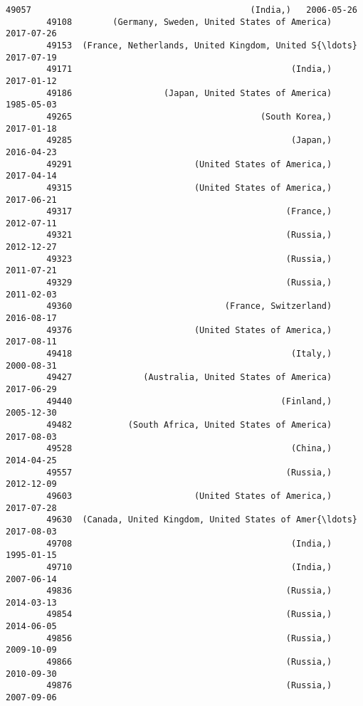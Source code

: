 \documentclass[11pt]{article}
\begin{document}
\begin{Verbatim}[commandchars=\\\{\}]
        49057                                           (India,)   2006-05-26   
        49108        (Germany, Sweden, United States of America)   2017-07-26   
        49153  (France, Netherlands, United Kingdom, United S{\ldots}   2017-07-19   
        49171                                           (India,)   2017-01-12   
        49186                  (Japan, United States of America)   1985-05-03   
        49265                                     (South Korea,)   2017-01-18   
        49285                                           (Japan,)   2016-04-23   
        49291                        (United States of America,)   2017-04-14   
        49315                        (United States of America,)   2017-06-21   
        49317                                          (France,)   2012-07-11   
        49321                                          (Russia,)   2012-12-27   
        49323                                          (Russia,)   2011-07-21   
        49329                                          (Russia,)   2011-02-03   
        49360                              (France, Switzerland)   2016-08-17   
        49376                        (United States of America,)   2017-08-11   
        49418                                           (Italy,)   2000-08-31   
        49427              (Australia, United States of America)   2017-06-29   
        49440                                         (Finland,)   2005-12-30   
        49482           (South Africa, United States of America)   2017-08-03   
        49528                                           (China,)   2014-04-25   
        49557                                          (Russia,)   2012-12-09   
        49603                        (United States of America,)   2017-07-28   
        49630  (Canada, United Kingdom, United States of Amer{\ldots}   2017-08-03   
        49708                                           (India,)   1995-01-15   
        49710                                           (India,)   2007-06-14   
        49836                                          (Russia,)   2014-03-13   
        49854                                          (Russia,)   2014-06-05   
        49856                                          (Russia,)   2009-10-09   
        49866                                          (Russia,)   2010-09-30   
        49876                                          (Russia,)   2007-09-06   
        

\end{Verbatim}
\end{document}

